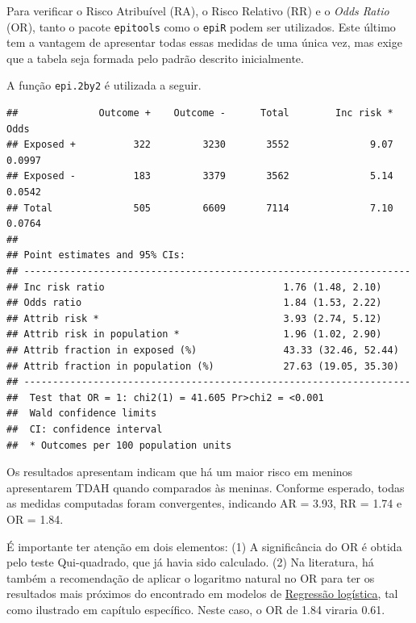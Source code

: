 \documentclass[
]{book}
\newenvironment{Shaded}{\begin{snugshade}}{\end{snugshade}}
\newcommand{\FunctionTok}[1]{\textcolor[rgb]{0.00,0.00,0.00}{#1}}
\newcommand{\NormalTok}[1]{#1}
\newcommand{\SpecialCharTok}[1]{\textcolor[rgb]{0.00,0.00,0.00}{#1}}
\begin{document}
Para verificar o Risco Atribuível (RA), o Risco Relativo (RR) e o \emph{Odds Ratio} (OR), tanto o pacote \texttt{epitools} como o \texttt{epiR} podem ser utilizados. Este último tem a vantagem de apresentar todas essas medidas de uma única vez, mas exige que a tabela seja formada pelo padrão descrito inicialmente.

A função \texttt{epi.2by2} é utilizada a seguir.

\begin{Shaded}
\end{Shaded}

\begin{verbatim}
##              Outcome +    Outcome -      Total        Inc risk *        Odds
## Exposed +          322         3230       3552              9.07      0.0997
## Exposed -          183         3379       3562              5.14      0.0542
## Total              505         6609       7114              7.10      0.0764
## 
## Point estimates and 95% CIs:
## -------------------------------------------------------------------
## Inc risk ratio                               1.76 (1.48, 2.10)
## Odds ratio                                   1.84 (1.53, 2.22)
## Attrib risk *                                3.93 (2.74, 5.12)
## Attrib risk in population *                  1.96 (1.02, 2.90)
## Attrib fraction in exposed (%)               43.33 (32.46, 52.44)
## Attrib fraction in population (%)            27.63 (19.05, 35.30)
## -------------------------------------------------------------------
##  Test that OR = 1: chi2(1) = 41.605 Pr>chi2 = <0.001
##  Wald confidence limits
##  CI: confidence interval
##  * Outcomes per 100 population units
\end{verbatim}

Os resultados apresentam indicam que há um maior risco em meninos apresentarem TDAH quando comparados às meninas. Conforme esperado, todas as medidas computadas foram convergentes, indicando AR = 3.93, RR = 1.74 e OR = 1.84.

É importante ter atenção em dois elementos: (1) A significância do OR é obtida pelo teste Qui-quadrado, que já havia sido calculado. (2) Na literatura, há também a recomendação de aplicar o logaritmo natural no OR para ter os resultados mais próximos do encontrado em modelos de \protect\hyperlink{17_regressao_logistica_binaria}{Regressão logística}, tal como ilustrado em capítulo específico. Neste caso, o OR de 1.84 viraria 0.61.
\end{document}
